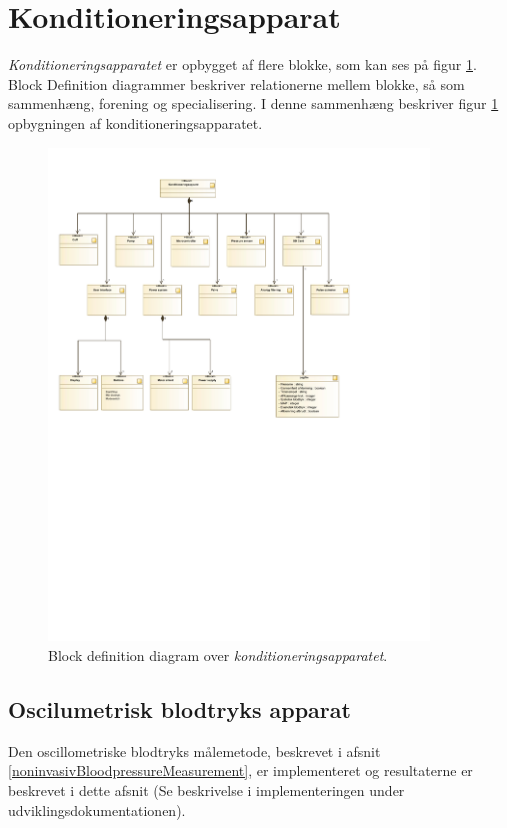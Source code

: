 \section{Konditioneringsapparat}
\textit{Konditioneringsapparatet} er opbygget af flere blokke, som kan ses på figur \ref{fig:BDD(SystemOverview)}. Block Definition diagrammer beskriver relationerne mellem blokke, så som sammenhæng, forening og specialisering. I denne sammenhæng beskriver figur \ref{fig:BDD(SystemOverview)} opbygningen af konditioneringsapparatet. 
\begin{figure}[H]
	\centering
	\includegraphics[width=0.9\textwidth]{billeder/BDD(SystemOverview).pdf}
	\caption{Block definition diagram over \textit{konditioneringsapparatet}.}\label{fig:BDD(SystemOverview)}
\end{figure}

\subsection{Oscilumetrisk blodtryks apparat}
Den oscillometriske blodtryks målemetode, beskrevet i afsnit \ref{noninvasivBloodpressureMeasurement}, er implementeret og resultaterne er beskrevet i dette afsnit (Se beskrivelse i implementeringen under udviklingsdokumentationen).

